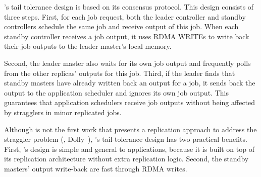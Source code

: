 \xxx's tail tolerance design is based on its \paxos consensus protocol. This 
design consists of three steps. First, for each job request, both the leader 
controller and standby controllers schedule the same job and receive output of 
this job. When each standby controller receives a job output, it 
uses RDMA WRITEs to write back their job outputs to the leader master's local 
memory.

Second, the leader master also waits for its own job output and frequently 
polls from the other replicas' outputs for this job. Third, if the leader finds 
that standby masters have already written back an output for a job, it sends 
back the output to the application scheduler and ignores its own job output. 
This guarantees that application schedulers receive job outputs without being 
affected by stragglers in minor replicated jobs.

Although \xxx is not the first work that presents a replication approach to 
address the straggler problem (\eg, Dolly~\cite{dolly:nsdi13}), \xxx's 
tail-tolerance design has two practical benefits. First, \xxx's design is 
simple and general to applications, because it is built on top of its \paxos 
replication architecture without extra replication logic. Second, the standby 
masters' output write-back are fast through RDMA writes. 
